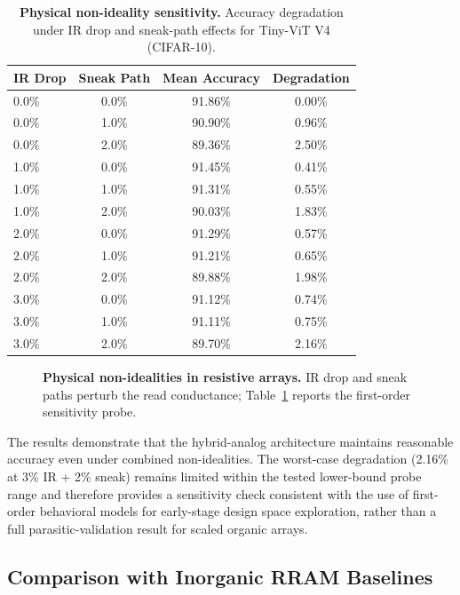 \begin{table}[ht]
\centering
\caption{\textbf{Physical non-ideality sensitivity.} Accuracy degradation under IR drop and sneak-path effects for Tiny-ViT V4 (CIFAR-10).}
\label{tab:nonideality-sensitivity}
\small
\begin{tabular}{@{}lccc@{}}
\toprule
\textbf{IR Drop} & \textbf{Sneak Path} & \textbf{Mean Accuracy} & \textbf{Degradation} \\
\midrule
0.0\% & 0.0\% & 91.86\% & 0.00\% \\
0.0\% & 1.0\% & 90.90\% & 0.96\% \\
0.0\% & 2.0\% & 89.36\% & 2.50\% \\
1.0\% & 0.0\% & 91.45\% & 0.41\% \\
1.0\% & 1.0\% & 91.31\% & 0.55\% \\
1.0\% & 2.0\% & 90.03\% & 1.83\% \\
2.0\% & 0.0\% & 91.29\% & 0.57\% \\
2.0\% & 1.0\% & 91.21\% & 0.65\% \\
2.0\% & 2.0\% & 89.88\% & 1.98\% \\
3.0\% & 0.0\% & 91.12\% & 0.74\% \\
3.0\% & 1.0\% & 91.11\% & 0.75\% \\
3.0\% & 2.0\% & 89.70\% & 2.16\% \\
\bottomrule
\end{tabular}
\end{table}

\begin{figure}[ht]
    \centering
    \resizebox{0.90\textwidth}{!}{}
    \caption{\textbf{Physical non-idealities in resistive arrays.}
    IR drop and sneak paths perturb the read conductance; Table~\ref{tab:nonideality-sensitivity} reports the first-order sensitivity probe.}
    \label{fig:supp-nonideality}
\end{figure}

The results demonstrate that the hybrid-analog architecture maintains reasonable accuracy even under combined non-idealities. The worst-case degradation (2.16\% at 3\% IR + 2\% sneak) remains limited within the tested lower-bound probe range and therefore provides a sensitivity check consistent with the use of first-order behavioral models for early-stage design space exploration, rather than a full parasitic-validation result for scaled organic arrays.

\subsection{Comparison with Inorganic RRAM Baselines}
\label{subsec:inorganic-comparison}


